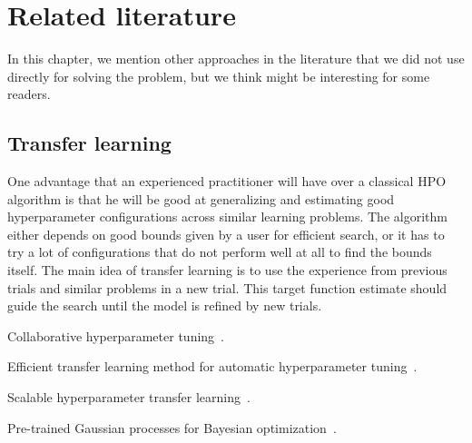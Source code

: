 \chapter{Related literature}
In this chapter, we mention other approaches in the literature that we did not use directly for solving the problem, but we think might be interesting for some readers.

\section{Transfer learning}

One advantage that an experienced practitioner will have over a classical HPO algorithm is that he will be good at generalizing and estimating good hyperparameter configurations across similar learning problems. The algorithm either depends on good bounds given by a user for efficient search, or it has to try a lot of configurations that do not perform well at all to find the bounds itself. The main idea of transfer learning is to use the experience from previous trials and similar problems in a new trial. This target function estimate should guide the search until the model is refined by new trials.

Collaborative hyperparameter tuning~\cite{bardenet2013collaborative}.

Efficient transfer learning method for automatic hyperparameter tuning~\cite{yogatama2014efficient}.

Scalable hyperparameter transfer learning~\cite{perrone2018scalable}.

Pre-trained Gaussian processes for Bayesian optimization~\cite{wang2021pre}.

